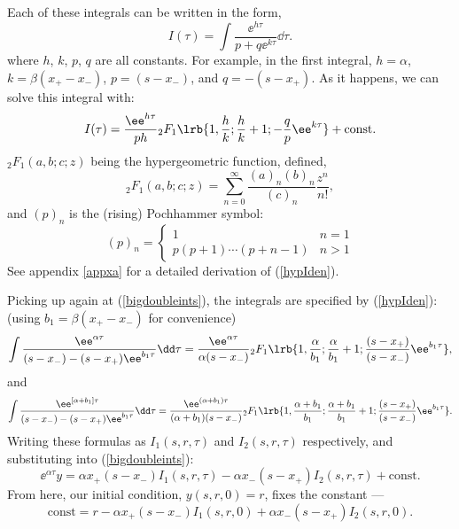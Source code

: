 \noindent
Each of these integrals can be written in the form,
\begin{equation*}
I(\tau) = \int\frac{\ee^{h\tau}}{p+q\ee^{k\tau}}\dd\tau.
\end{equation*}
where $h$, $k$, $p$, $q$ are all constants. For example, in the first integral, $h = \alpha$, $k = \beta(x_+ - x_-)$, $p = (s-x_-)$, and $q = -(s-x_+)$. As it happens, we can solve this integral with:
\begin{equation}
\label{hypIden}
I(\tau) = \frac{\ee^{h\tau}}{ph} {}_2F_1\lrb{1,\frac{h}{k};\frac{h}{k}+1; -\frac{q}{p}\ee^{k\tau}} + \text{const}.
\end{equation}
${}_2F_1(a,b;c;z)$ being the hypergeometric function, defined,
\begin{equation*}
{}_2F_1(a,b;c;z) =\sum^\infty_{n=0}\frac{(a)_n(b)_n}{(c)_n}\frac{z^n}{n!},
\end{equation*}
and $(p)_n$ is the (rising) Pochhammer  symbol:
$$(p)_n = \begin{cases} 1 &n=1\\
p(p+1)\cdots(p+n-1) &n>1
\end{cases}
$$
See appendix \ref{appxa} for a detailed derivation of (\ref{hypIden}).\par
Picking up again at (\ref{bigdoubleints}), the integrals are specified by (\ref{hypIden}):\\
(using $b_1 = \beta(x_+ - x_-)$ for convenience)
\begin{equation*}
\int \frac{ \ee^{\alpha \tau} } {(s-x_-) - (s-x_+)\ee^{b_1 \tau}}\dd\tau =  \frac{\ee^{\alpha\tau}}{\alpha(s-x_-)} {}_2F_1\lrb{1,\frac{\alpha}{b_1 };\frac{\alpha}{b_1 }+1; \frac{(s-x_+)}{(s-x_-)}\ee^{b_1  \tau}},
\end{equation*}
and
\begin{equation*}
\int\frac{\ee^{\left[ \alpha +b_1\right]\tau}}{(s-x_-) - (s-x_+)\ee^{b_1 \tau}}\dd\tau =   \frac{\ee^{(\alpha+b_1 )\tau}}{(\alpha+b_1 )(s-x_-)} {}_2F_1\lrb{1,\frac{\alpha + b_1 }{b_1 };\frac{\alpha + b_1 }{b_1 }+1; \frac{(s-x_+)}{(s-x_-)}\ee^{b_1  \tau}}.
\end{equation*}
Writing these formulas as $I_1(s,r,\tau)$ and $I_2(s,r,\tau)$ respectively, and substituting into (\ref{bigdoubleints}):
\begin{equation}
\label{eywithconst}
\ee^{\alpha\tau }y = \alpha x_+(s-x_-)I_1(s,r,\tau) - \alpha x_- (s-x_+) I_2(s,r,\tau) + \text{const}.
\end{equation}
From here, our initial condition, $y(s,r,0) = r$, fixes the constant ---
$$\text{const} = r -  \alpha x_+(s-x_-)I_1(s,r,0) + \alpha x_- (s-x_+) I_2(s,r,0).$$
